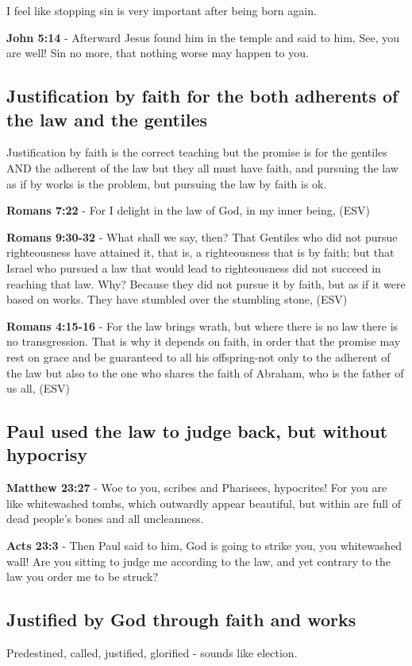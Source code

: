 \documentclass[11pt]{article}
\begin{document}
I feel like stopping sin is very important after being born again.

\textbf{John 5:14} - Afterward Jesus found him in the temple and said to him, See, you are well! Sin no more, that nothing worse may happen to you.

\subsection{Justification by faith for the both adherents of the law and the gentiles}
\label{sec:org063597e}
Justification by faith is the correct teaching but the promise is for the gentiles AND the adherent of the law but they all must have faith, and pursuing the law as if by works is the problem, but pursuing the law by faith is ok.

\textbf{Romans 7:22} - For I delight in the law of God, in my inner being, (ESV)

\textbf{Romans 9:30-32} - What shall we say, then? That Gentiles who did not pursue righteousness have attained it, that is, a righteousness that is by faith; but that Israel who pursued a law that would lead to righteousness did not succeed in reaching that law. Why? Because they did not pursue it by faith, but as if it were based on works. They have stumbled over the stumbling stone, (ESV)

\textbf{Romans 4:15-16} - For the law brings wrath, but where there is no law there is no transgression. That is why it depends on faith, in order that the promise may rest on grace and be guaranteed to all his offspring-not only to the adherent of the law but also to the one who shares the faith of Abraham, who is the father of us all, (ESV)

\subsection{Paul used the law to judge back, but without hypocrisy}
\label{sec:orgcac1674}
\textbf{Matthew 23:27} - Woe to you, scribes and Pharisees, hypocrites! For you are like whitewashed tombs, which outwardly appear beautiful, but within are full of dead people's bones and all uncleanness.

\textbf{Acts 23:3} - Then Paul said to him, God is going to strike you, you whitewashed wall! Are you sitting to judge me according to the law, and yet contrary to the law you order me to be struck?

\subsection{Justified by God through faith and works}
\label{sec:org35a2330}
Predestined, called, justified, glorified - sounds like election.
\end{document}

